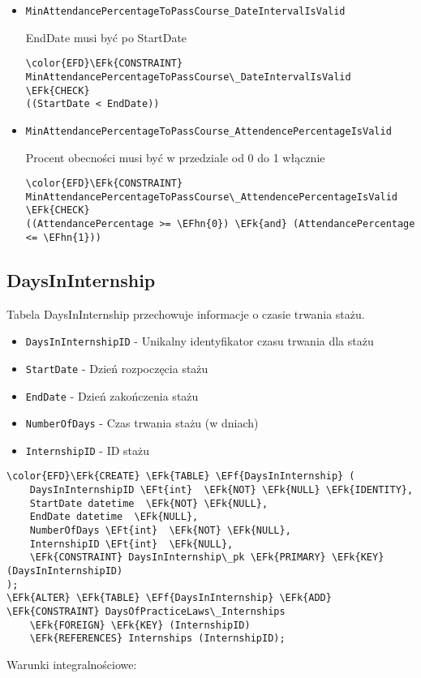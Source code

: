 \documentclass[11pt]{article}
\newcommand{\EFk}[1]{\textcolor{EFk}{\textbf{#1}}} %
\newcommand{\EFf}[1]{\textcolor{EFf}{#1}} %
\newcommand{\EFt}[1]{\textcolor{EFt}{\textbf{#1}}} %
\newcommand{\EFhn}[1]{\textcolor{EFhn}{#1}} %
\begin{document}
\begin{itemize}
\item \texttt{MinAttendancePercentageToPassCourse\_DateIntervalIsValid}

EndDate musi być po StartDate
\begin{Code}
\begin{Verbatim}
\color{EFD}\EFk{CONSTRAINT} MinAttendancePercentageToPassCourse\_DateIntervalIsValid \EFk{CHECK}
((StartDate < EndDate))
\end{Verbatim}
\end{Code}
\item \texttt{MinAttendancePercentageToPassCourse\_AttendencePercentageIsValid}

Procent obecności musi być w przedziale od 0 do 1 włącznie
\begin{Code}
\begin{Verbatim}
\color{EFD}\EFk{CONSTRAINT} MinAttendancePercentageToPassCourse\_AttendencePercentageIsValid \EFk{CHECK}
((AttendancePercentage >= \EFhn{0}) \EFk{and} (AttendancePercentage <= \EFhn{1}))
\end{Verbatim}
\end{Code}
\end{itemize}
\subsection{DaysInInternship}
\label{sec:org1080ab4}
Tabela DaysInInternship przechowuje informacje o czasie trwania stażu.
\begin{itemize}
\item \texttt{DaysInInternshipID} - Unikalny identyfikator czasu trwania dla stażu
\item \texttt{StartDate} - Dzień rozpoczęcia stażu
\item \texttt{EndDate} - Dzień zakończenia stażu
\item \texttt{NumberOfDays} - Czas trwania stażu (w dniach)
\item \texttt{InternshipID} - ID stażu
\end{itemize}
\begin{Code}
\begin{Verbatim}
\color{EFD}\EFk{CREATE} \EFk{TABLE} \EFf{DaysInInternship} (
    DaysInInternshipID \EFt{int}  \EFk{NOT} \EFk{NULL} \EFk{IDENTITY},
    StartDate datetime  \EFk{NOT} \EFk{NULL},
    EndDate datetime  \EFk{NULL},
    NumberOfDays \EFt{int}  \EFk{NOT} \EFk{NULL},
    InternshipID \EFt{int}  \EFk{NULL},
    \EFk{CONSTRAINT} DaysInInternship\_pk \EFk{PRIMARY} \EFk{KEY}  (DaysInInternshipID)
);
\EFk{ALTER} \EFk{TABLE} \EFf{DaysInInternship} \EFk{ADD} \EFk{CONSTRAINT} DaysOfPracticeLaws\_Internships
    \EFk{FOREIGN} \EFk{KEY} (InternshipID)
    \EFk{REFERENCES} Internships (InternshipID);
\end{Verbatim}
\end{Code}
Warunki integralnościowe:
\end{document}
